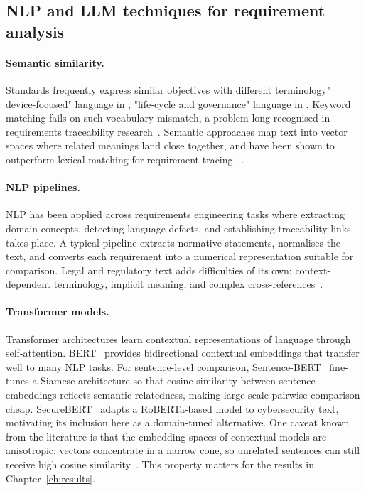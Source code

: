 \subsection{NLP and LLM techniques for requirement analysis}

\paragraph{Semantic similarity.}
Standards frequently express similar objectives with different terminology"
device-focused" language in \standardA{}, "life-cycle and governance" language in
\standardB{}. Keyword matching fails on such vocabulary mismatch, a problem
long recognised in requirements traceability
research~\cite{mahmoud2015semantics,rajpathak2022linking}. Semantic approaches
map text into vector spaces where related meanings land close together, and
have been shown to outperform lexical matching for requirement tracing
~\cite{mahmoud2015semantics}.

\paragraph{NLP pipelines.}
NLP has been applied across requirements engineering tasks where extracting domain
concepts, detecting language defects, and establishing traceability links
~\cite{zhao2021nlp4re,sonbol2022representation} takes place. A typical pipeline extracts
normative statements, normalises the text, and converts each requirement into
a numerical representation suitable for comparison. Legal and regulatory text
adds difficulties of its own: context-dependent terminology, implicit
meaning, and complex cross-references~\cite{ariai2025legal}.

\paragraph{Transformer models.}
Transformer architectures learn contextual representations of language through
self-attention. BERT~\cite{devlin2019bert} provides bidirectional contextual
embeddings that transfer well to many NLP tasks. For sentence-level
comparison, Sentence-BERT~\cite{reimers2019sbert} fine-tunes a Siamese
architecture so that cosine similarity between sentence embeddings reflects
semantic relatedness, making large-scale pairwise comparison cheap.
SecureBERT~\cite{aghaei2022securebert} adapts a RoBERTa-based model to
cybersecurity text, motivating its inclusion here as a domain-tuned
alternative. One caveat known from the literature is that the embedding spaces
of contextual models are anisotropic: vectors concentrate in a narrow cone,
so unrelated sentences can still receive high cosine
similarity~\cite{ethayarajh2019contextual}. This property matters for the
results in Chapter~\ref{ch:results}.

